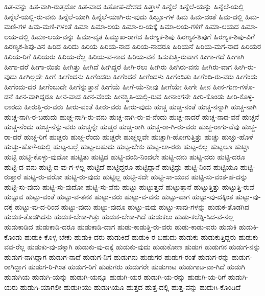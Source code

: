 {ಹಿತ-ವನ್ನು
ಹಿತ-ವಾಗಿ-ರುತ್ತದೋ
ಹಿತ-ವಾದ
ಹಿತೋಪ-ದೇಶದ
ಹಿತ್ತಾಳೆ
ಹಿನ್ನೆಲೆ
ಹಿನ್ನೆಲೆ-ಯನ್ನು
ಹಿನ್ನೆಲೆ-ಯಲ್ಲಿ
ಹಿನ್ನೆಲೆ-ಯಲ್ಲಿ-ರು-ವನು
ಹಿನ್ನೆಲೆ-ಯಾಗಿ
ಹಿನ್ನೆಲೆ-ಯಾಗಿ-ರು-ವುದು
ಹಿಬ್ರೂ-ಗಳ
ಹಿಮ
ಹಿಮ-ದಂತೆ
ಹಿಮ-ದಲ್ಲಿ
ಹಿಮ-ಮಣಿ-ಗಳ
ಹಿಮ-ಮಣಿ-ಗಳಂತೆ
ಹಿಮಾ
ಹಿಮಾ-ಲಯ
ಹಿಮಾ-ಲ-ಯಕ್ಕೆ
ಹಿಮಾ-ಲಯ-ಗಳಿಗೆ
ಹಿಮಾ-ಲಯದ
ಹಿಮಾ-ಲಯ-ದಲ್ಲಿ
ಹಿಮಾ-ಲಯ-ವನ್ನು
ಹಿಮಾ-ವೃತ
ಹಿಮ್ಮುಖ-ರಾಗದ
ಹಿರಣ್ಯಕ-ಶಿಪು
ಹಿರಣ್ಯಕ-ಶಿಪುಗೆ
ಹಿರಣ್ಯಕ-ಶಿಪು-ವಿಗೆ
ಹಿರಣ್ಯಕ-ಶಿಪು-ವಿನ
ಹಿರಿದ
ಹಿರಿದು
ಹಿರಿಯ
ಹಿರಿಯ-ನಾದ
ಹಿರಿಯ-ನಾದರೂ
ಹಿರಿಯನೆ
ಹಿರಿಯ-ಮಗ-ನಾದ
ಹಿರಿಯರ
ಹಿರಿಯ-ರಿಗೆ
ಹಿರಿಯರು
ಹಿರಿಯ-ರೆಲ್ಲ
ಹಿರಿಯ-ವ-ನಾದ
ಹಿರಿಯ-ವನೆ
ಹಿಸುಕುತ್ತಿ-ರುವಾಗ
ಹೀಗಾ-ಗದೆ
ಹೀಗಾಗಿ
ಹೀಗಾ-ದರೆ
ಹೀಗಾ-ಯಿತು
ಹೀಗಿತ್ತು
ಹೀಗಿದೆ
ಹೀಗಿದ್ದರೆ
ಹೀಗಿ-ರಲು
ಹೀಗಿರು
ಹೀಗಿರು-ವನು
ಹೀಗಿರು-ವಾಗ
ಹೀಗಿ-ರು-ವುದು
ಹೀಗಿಲ್ಲದೇ
ಹೀಗೆ
ಹೀಗೆಂದನು
ಹೀಗೆಂದರು
ಹೀಗೆಂದರೆ
ಹೀಗೆಂದಳು
ಹೀಗೆಂದಿತು
ಹೀಗೆಂದಿ-ರು-ವರು
ಹೀಗೆಂದು
ಹೀಗೆಂದು-ದರ
ಹೀಗೆಂಬುದೇ
ಹೀಗೆನ್ನುತ್ತಾನೆ
ಹೀಗೆಯೆ
ಹೀಗೆ-ಯೆ-ನೀವು
ಹೀಗೆಯೇ
ಹೀಗೇ
ಹೀನ
ಹೀನ-ಗುಣ-ಗಳೊ-ಡನೆ
ಹೀನ-ವಾಗಿದ್ದರೂ
ಹೀನ-ವಾದ
ಹೀನ-ವೆಂದು
ಹೀನಸ್ಥಿತಿ-ಯಲ್ಲಿ-ರುವ
ಹೀನಾಂಗನೇ
ಹೀರಿ-ಕೊಂಡು
ಹೀರಿ-ಕೊಳ್ಳ-ಲಾರದು
ಹೀರುತ್ತಿ-ರು-ವರು
ಹೀರು-ವಂತೆ
ಹೀರು-ವರು
ಹೀರು-ವುದು
ಹುಚ್ಚ
ಹುಚ್ಚ-ನಂತೆ
ಹುಚ್ಚ-ನನ್ನಾಗಿ
ಹುಚ್ಚ-ನಾಗಿ
ಹುಚ್ಚ-ನಾಗಿ-ರ-ಬಹುದು
ಹುಚ್ಚ-ನಾಗಿ-ರು-ವನು
ಹುಚ್ಚ-ನಾಗಿ-ರು-ವ-ನೆಂದು
ಹುಚ್ಚ-ನಾದರೆ
ಹುಚ್ಚ-ನಾದ-ವನೆ
ಹುಚ್ಚನೆ
ಹುಚ್ಚ-ನೆಂದು
ಹುಚ್ಚ-ನೆನ್ನು-ವರು
ಹುಚ್ಚನ್ನೇ
ಹುಚ್ಚರ
ಹುಚ್ಚ-ರಾಗಿ
ಹುಚ್ಚ-ರಾ-ಗಿ-ರು-ವರು
ಹುಚ್ಚ-ರಾಗು-ವೆವು
ಹುಚ್ಚ-ರಾ-ದರೆ
ಹುಚ್ಚ-ರಿಗೆ
ಹುಚ್ಚರು
ಹುಚ್ಚ-ರೆಂದು
ಹುಚ್ಚರೇ
ಹುಚ್ಚಲ್ಲವೇ
ಹುಚ್ಚಾಗಿ-ಹೋಗುತ್ತಿತ್ತು
ಹುಚ್ಚು
ಹುಚ್ಚು-ಹೊಳೆ
ಹುಚ್ಚು-ಹೊಳೆ-ಯಲ್ಲಿ
ಹುಟ್ಟ-ಬಲ್ಲೆ
ಹುಟ್ಟ-ಬಹುದು
ಹುಟ್ಟ-ಬೇಕು
ಹುಟ್ಟ-ಲಾ-ರರು
ಹುಟ್ಟ-ಲಿಲ್ಲ
ಹುಟ್ಟಲೂ
ಹುಟ್ಟಾ
ಹುಟ್ಟಿ
ಹುಟ್ಟಿ-ಕೊಳ್ಳು-ವುದೋ
ಹುಟ್ಟಿತು
ಹುಟ್ಟಿದ
ಹುಟ್ಟಿ-ದಂದಿ-ನಿಂದಲೇ
ಹುಟ್ಟಿ-ದನು
ಹುಟ್ಟಿ-ದರು
ಹುಟ್ಟಿ-ದರೂ
ಹುಟ್ಟಿ-ದ-ವನು
ಹುಟ್ಟಿ-ದ-ವು-ಗ-ಳಲ್ಲ
ಹುಟ್ಟಿದೆ
ಹುಟ್ಟಿದ್ದರೂ
ಹುಟ್ಟಿದ್ದಾನೆ
ಹುಟ್ಟಿದ್ದು
ಹುಟ್ಟಿ-ನಿಂದ
ಹುಟ್ಟಿಯೂ
ಹುಟ್ಟಿ-ರುತ್ತಾರೆ
ಹುಟ್ಟಿ-ರು-ವರೋ
ಹುಟ್ಟಿ-ರು-ವುದು
ಹುಟ್ಟಿಲ್ಲ
ಹುಟ್ಟಿ-ಸದೇ
ಹುಟ್ಟಿ-ಸಾ-ಯುವ
ಹುಟ್ಟಿ-ಸು-ವಂತ-ಹ-ದನ್ನು
ಹುಟ್ಟಿ-ಸು-ವುದು
ಹುಟ್ಟಿ-ಸು-ವುದೋ
ಹುಟ್ಟಿ-ಸು-ವೆನು
ಹುಟ್ಟು
ಹುಟ್ಟುತ್ತದೆ
ಹುಟ್ಟುತ್ತಾನೆ
ಹುಟ್ಟುತ್ತಿತ್ತು
ಹುಟ್ಟುತ್ತಿ-ರುವೆ
ಹುಟ್ಟುವ
ಹುಟ್ಟು-ವಂತೆ
ಹುಟ್ಟು-ವ-ತನಕ
ಹುಟ್ಟು-ವರು
ಹುಟ್ಟು-ವ-ವನು
ಹುಟ್ಟು-ವಾಗ
ಹುಟ್ಟು-ವು-ದಕ್ಕಿಂತ
ಹುಟ್ಟು-ವು-ದಕ್ಕೆ
ಹುಟ್ಟು-ವು-ದ-ರಿಂದ
ಹುಟ್ಟು-ವುದು
ಹುಟ್ಟು-ವುದೂ
ಹುಟ್ಟು-ವುವು
ಹುಟ್ಟು-ಸಾವು-ಗಳನ್ನು
ಹುಡುಕ-ತೊಡಗಿದ
ಹುಡುಕ-ತೊಡಗಿದನು
ಹುಡುಕ-ಬೇಕಾ-ಗಿತ್ತು
ಹುಡುಕ-ಬೇಕಾ-ಗಿದೆ
ಹುಡುಕಲು
ಹುಡು-ಕಲೆತ್ನಿ-ಸಿದ-ವ-ನಲ್ಲ
ಹುಡುಕಾಡಿದ
ಹುಡುಕಾಡಿ-ದರೂ
ಹುಡುಕಾಡಿ-ದಾಗ
ಹುಡು-ಕಾಡುತ್ತಿ-ರು-ವರು
ಹುಡು-ಕಾಡು-ವರು
ಹುಡುಕಿ
ಹುಡುಕಿ-ಕೊಂಡು
ಹುಡುಕಿ-ಕೊಳ್ಳ-ಬೇಕು
ಹುಡುಕಿ-ದರು
ಹುಡುಕಿದೆ
ಹುಡುಕಿ-ರ-ಬಹುದು
ಹುಡುಕು
ಹುಡುಕುತ್ತಿದ್ದರು
ಹುಡುಕು-ವವ-ರೆಲ್ಲ
ಹುಡುಕು-ವು-ದಕ್ಕಾಗಿ
ಹುಡುಕು-ವು-ದಕ್ಕೆ
ಹುಡುಕು-ವುದು
ಹುಡುಕೋಣ
ಹುಡುಗ
ಹುಡುಗನ
ಹುಡುಗ-ನನ್ನು
ಹುಡುಗ-ನಾಗಿದ್ದಾಗ
ಹುಡುಗ-ನಾದೆ
ಹುಡುಗ-ನಿಗೆ
ಹುಡುಗನು
ಹುಡುಗರ
ಹುಡುಗ-ರಂತೆ
ಹುಡುಗ-ರನ್ನು
ಹುಡುಗ-ರಾಗಿದ್ದಾಗ
ಹುಡುಗ-ರಿ-ಗಿಂತ
ಹುಡುಗ-ರಿಗೆ
ಹುಡುಗರು
ಹುಡುಗರೇ
ಹುಡುಗಾಟ
ಹುಡುಗಾಟ-ವಾ-ಗಿದೆ
ಹುಡುಗಿ
ಹುಡುಗಿಯ
ಹುಡುಗಿ-ಯನ್ನು
ಹುಡುಗಿ-ಯನ್ನೂ
ಹುಡುಗಿ-ಯರ
ಹುಡುಗಿ-ಯ-ರನ್ನು
ಹುಡುಗಿ-ಯ-ರಿಗೆ
ಹುಡುಗಿ-ಯರು
ಹುಡುಗಿ-ಯಾಗಲೀ
ಹುಡುಗಿಯು
ಹುಡುಗಿಯೂ
ಹುತ್ತದ
ಹುತ್ತ-ದಲ್ಲಿ
ಹುತ್ತ-ವನ್ನು
ಹುದುಗಿ-ಕೊಂಡಿದೆ
}
